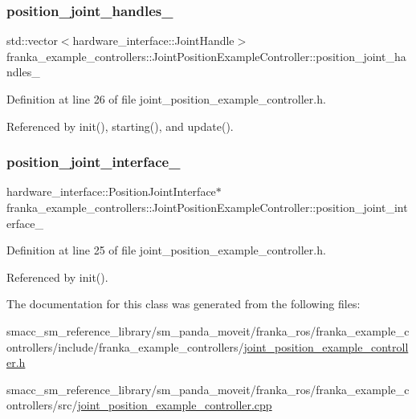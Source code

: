 \subsubsection{\texorpdfstring{position\+\_\+joint\+\_\+handles\+\_\+}{position\_joint\_handles\_}}
{\footnotesize\ttfamily std\+::vector$<$hardware\+\_\+interface\+::\+Joint\+Handle$>$ franka\+\_\+example\+\_\+controllers\+::\+Joint\+Position\+Example\+Controller\+::position\+\_\+joint\+\_\+handles\+\_\+\hspace{0.3cm}{\ttfamily [private]}}



Definition at line 26 of file joint\+\_\+position\+\_\+example\+\_\+controller.\+h.



Referenced by init(), starting(), and update().

\mbox{\label{classfranka__example__controllers_1_1JointPositionExampleController_a04b7891338d07eeb78febf6085190f83}} 
\subsubsection{\texorpdfstring{position\+\_\+joint\+\_\+interface\+\_\+}{position\_joint\_interface\_}}
{\footnotesize\ttfamily hardware\+\_\+interface\+::\+Position\+Joint\+Interface$\ast$ franka\+\_\+example\+\_\+controllers\+::\+Joint\+Position\+Example\+Controller\+::position\+\_\+joint\+\_\+interface\+\_\+\hspace{0.3cm}{\ttfamily [private]}}



Definition at line 25 of file joint\+\_\+position\+\_\+example\+\_\+controller.\+h.



Referenced by init().



The documentation for this class was generated from the following files\+:\begin{DoxyCompactItemize}
\item 
smacc\+\_\+sm\+\_\+reference\+\_\+library/sm\+\_\+panda\+\_\+moveit/franka\+\_\+ros/franka\+\_\+example\+\_\+controllers/include/franka\+\_\+example\+\_\+controllers/\hyperlink{joint__position__example__controller_8h}{joint\+\_\+position\+\_\+example\+\_\+controller.\+h}\item 
smacc\+\_\+sm\+\_\+reference\+\_\+library/sm\+\_\+panda\+\_\+moveit/franka\+\_\+ros/franka\+\_\+example\+\_\+controllers/src/\hyperlink{joint__position__example__controller_8cpp}{joint\+\_\+position\+\_\+example\+\_\+controller.\+cpp}\end{DoxyCompactItemize}
